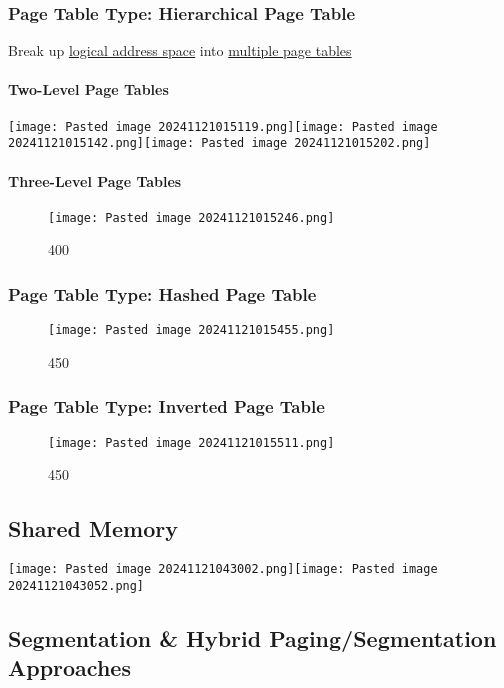 \subsubsection*{Page Table Type: Hierarchical Page Table}

Break up \ul{logical address space} into \ul{multiple page tables}

\paragraph*{Two-Level Page Tables}

\texttt{[image: Pasted image 20241121015119.png]}\texttt{[image: Pasted image 20241121015142.png]}\texttt{[image: Pasted image 20241121015202.png]}

\paragraph*{Three-Level Page Tables}

\begin{figure}
\centering
\texttt{[image: Pasted image 20241121015246.png]}
\caption{400}
\end{figure}

\subsubsection*{Page Table Type: Hashed Page Table}

\begin{figure}
\centering
\texttt{[image: Pasted image 20241121015455.png]}
\caption{450}
\end{figure}

\subsubsection*{Page Table Type: Inverted Page Table}

\begin{figure}
\centering
\texttt{[image: Pasted image 20241121015511.png]}
\caption{450}
\end{figure}

\subsection*{Shared Memory}

\texttt{[image: Pasted image 20241121043002.png]}\texttt{[image: Pasted image 20241121043052.png]}

\subsection*{Segmentation \& Hybrid Paging/Segmentation Approaches}

